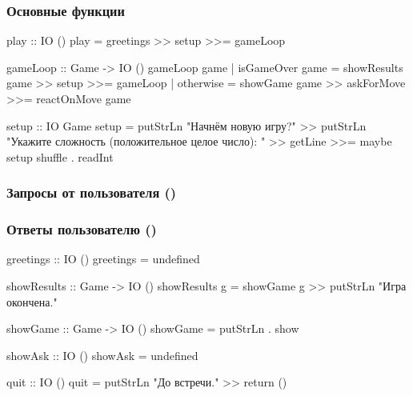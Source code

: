 \subsubsection{Основные функции}

\begin{code}
play :: IO ()
play = greetings >> setup >>= gameLoop

gameLoop :: Game -> IO ()
gameLoop game 
    | isGameOver game   = showResults game >> setup >>= gameLoop
    | otherwise         = showGame game >> askForMove >>= reactOnMove game

setup :: IO Game
setup = putStrLn "Начнём новую игру?" >>
    putStrLn "Укажите сложность (положительное целое число): " >>
    getLine >>= maybe setup shuffle . readInt 
\end{code}

\subsubsection{Запросы от пользователя ()}



\subsubsection{Ответы пользователю ()}

\begin{code}
greetings :: IO ()
greetings = undefined

showResults :: Game -> IO ()
showResults g = showGame g >> putStrLn "Игра окончена."

showGame :: Game -> IO ()
showGame = putStrLn . show

showAsk :: IO ()
showAsk = undefined

quit :: IO ()
quit = putStrLn "До встречи." >> return ()
\end{code}

